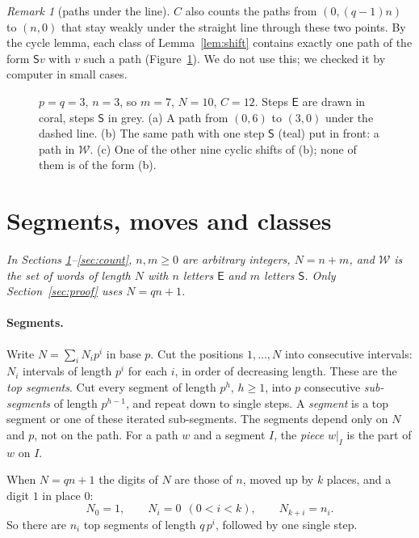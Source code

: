 \documentclass[11pt]{article}
\theoremstyle{definition}
\theoremstyle{remark}
\newtheorem{remark}[theorem]{Remark}
\newcommand{\E}{\textsf{E}}
\newcommand{\Ss}{\textsf{S}}
\newcommand{\W}{\mathcal{W}}
\begin{document}
\begin{remark}[paths under the line]\label{rem:dyck}
$C$ also counts the paths from $(0,(q-1)n)$ to $(n,0)$ that stay weakly under the straight line through these two
points. By the cycle lemma, each class of Lemma~\ref{lem:shift} contains exactly one path of the form $\Ss v$ with $v$
such a path (Figure~\ref{fig:models}). We do not use this; we checked it by computer in small cases.
\end{remark}

\begin{figure}[ht]
\centering
\begin{tikzpicture}

\end{tikzpicture}
\caption{$p=q=3$, $n=3$, so $m=7$, $N=10$, $C=12$. Steps $\E$ are drawn in coral, steps $\Ss$ in grey.
(a) A path from $(0,6)$ to $(3,0)$ under the dashed line. (b) The same path with one step $\Ss$ (teal) put in
front: a path in $\W$. (c) One of the other nine cyclic shifts of (b); none of them is of the form (b).}
\label{fig:models}
\end{figure}

\section{Segments, moves and classes}\label{sec:moves}

\emph{In Sections \ref{sec:moves}--\ref{sec:count}, $n,m\ge 0$ are arbitrary integers, $N=n+m$, and $\W$ is the set of words of length $N$
with $n$ letters $\E$ and $m$ letters $\Ss$. Only Section~\ref{sec:proof} uses $N=qn+1$.}

\paragraph{Segments.} Write $N=\sum_i N_ip^i$ in base $p$. Cut the positions $1,\dots,N$ into consecutive intervals:
$N_i$ intervals of length $p^i$ for each $i$, in order of decreasing length. These are the \emph{top segments}.
Cut every segment of length $p^h$, $h\ge1$, into $p$ consecutive \emph{sub-segments} of length $p^{h-1}$, and
repeat down to single steps. A \emph{segment} is a top segment or one of these iterated sub-segments.
The segments depend only on $N$ and $p$, not on the path. For a path $w$ and a segment $I$, the
\emph{piece} $w|_I$ is the part of $w$ on $I$.

When $N=qn+1$ the digits of $N$ are those of $n$, moved up by $k$ places, and a digit $1$ in place $0$:
\begin{equation}\label{eq:digitsN}
N_0=1,\qquad N_i=0\ \ (0<i<k),\qquad N_{k+i}=n_i .
\end{equation}
So there are $n_i$ top segments of length $q\,p^i$, followed by one single step.
\end{document}
